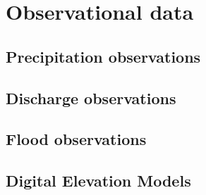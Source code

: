\chapter{Observational data}

\section{Precipitation observations}

\section{Discharge observations}

\section{Flood observations}

\section{Digital Elevation Models}
